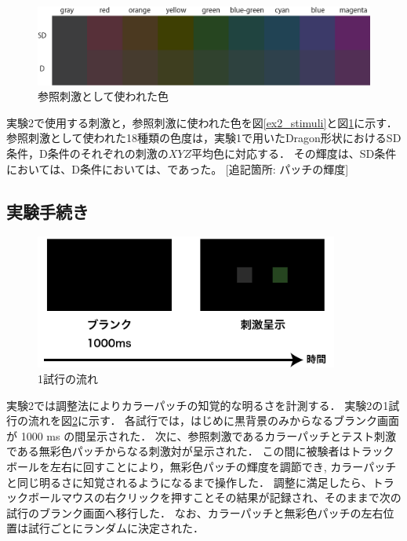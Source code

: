             \begin{figure}[h]
                \centering
                \includegraphics[width=14.0cm]{./img/ex2_stimuli_p.png}
                \caption{参照刺激として使われた色}
                \label{ex2_stimuli_set}
            \end{figure}
            \newpage

            実験2で使用する刺激と，参照刺激に使われた色を図\ref{ex2_stimuli}と図\ref{ex2_stimuli_set}に示す．
            参照刺激として使われた18種類の色度は，実験1で用いたDragon形状におけるSD条件，D条件のそれぞれの刺激の$XYZ$平均色に対応する．
            その輝度は、SD条件においては、D条件においては、であった。
            [追記箇所: パッチの輝度]

        \subsection{実験手続き}

            \begin{figure}[h]
                \centering
                \includegraphics[width=10.0cm]{./img/ex2_procedure.png}
                \caption{1試行の流れ}
                \label{ex2_procedure}
            \end{figure}

            実験2では調整法によりカラーパッチの知覚的な明るさを計測する．
            実験2の1試行の流れを図\ref{ex2_procedure}に示す．
            各試行では，はじめに黒背景のみからなるブランク画面が 1000 ms の間呈示された．
            次に、参照刺激であるカラーパッチとテスト刺激である無彩色パッチからなる刺激対が呈示された．
            この間に被験者はトラックボールを左右に回すことにより，無彩色パッチの輝度を調節でき, カラーパッチと同じ明るさに知覚されるようになるまで操作した．
            調整に満足したら、トラックボールマウスの右クリックを押すことその結果が記録され、そのままで次の試行のブランク画面へ移行した．
            なお、カラーパッチと無彩色パッチの左右位置は試行ごとにランダムに決定された．

